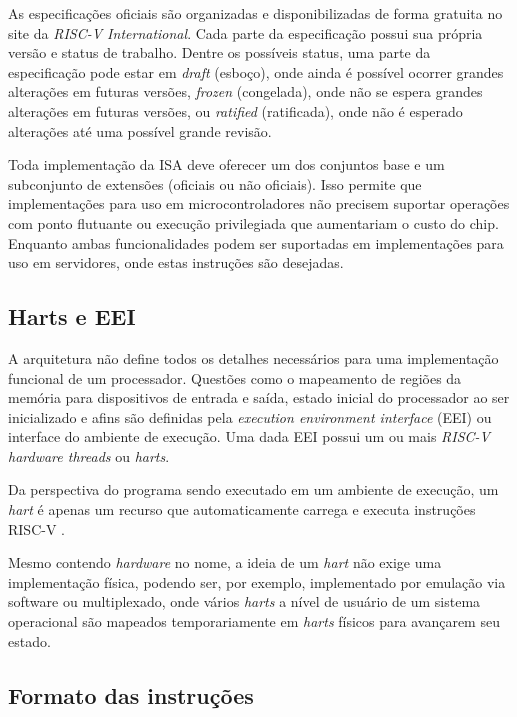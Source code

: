   As especificações oficiais são organizadas e disponibilizadas de forma gratuita 
  no site da \emph{RISC-V International}. Cada parte da especificação possui sua própria versão 
  e status de trabalho. Dentre os possíveis status, uma parte da especificação pode 
  estar em \emph{draft} (esboço), onde ainda é possível ocorrer grandes alterações 
  em futuras versões, \emph{frozen} (congelada), onde não se espera grandes alterações 
  em futuras versões, ou \emph{ratified} (ratificada), onde não é esperado alterações até
  uma possível grande revisão.
  
  Toda implementação da ISA deve oferecer um dos conjuntos base e um subconjunto de 
  extensões (oficiais ou não oficiais). Isso permite que implementações para uso em 
  microcontroladores não precisem suportar operações com ponto flutuante ou execução 
  privilegiada que aumentariam o custo do chip. Enquanto ambas funcionalidades podem
  ser suportadas em implementações para uso em servidores, onde estas instruções são
  desejadas.
  
\subsection{Harts e EEI}
\label{sec:harts}

  A arquitetura não define todos os detalhes necessários para uma implementação funcional 
  de um processador. Questões como o mapeamento de regiões da memória para dispositivos 
  de entrada e saída, estado inicial do processador ao ser inicializado e afins são 
  definidas pela \emph{execution environment interface} (EEI) ou interface do ambiente de execução. 
  Uma dada EEI possui um ou mais \emph{RISC-V hardware threads} ou \emph{harts}.

  Da perspectiva do programa sendo executado em um ambiente de execução, um \emph{hart}
  é apenas um recurso que automaticamente carrega e executa instruções RISC-V \citep{RVS1}.
  
  Mesmo contendo \emph{hardware} no nome, a ideia de um \emph{hart} não exige uma implementação física,
  podendo ser, por exemplo, implementado por emulação via software ou multiplexado, onde vários
  \emph{harts} a nível de usuário de um sistema operacional são mapeados temporariamente em 
  \emph{harts} físicos para avançarem seu estado.

\subsection{Formato das instruções}
\label{sec:instfmt}

